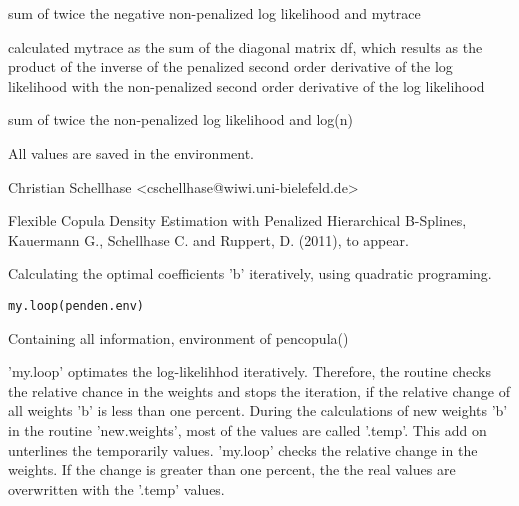 \documentclass[a4paper]{book}
\begin{document}
%
\begin{Value}
\begin{ldescription}
\item[\code{AIC}] sum of twice the negative non-penalized log likelihood and mytrace
\item[\code{trace}] calculated mytrace as the sum of the diagonal matrix
df, which results as the product of the inverse of the penalized
second order derivative of the log likelihood with the non-penalized
second order derivative of the log likelihood
\item[\code{BIC}] sum of twice the non-penalized log likelihood and log(n)
\end{ldescription}
All values are saved in the environment.
\end{Value}
%
\begin{Author}\relax
Christian Schellhase <cschellhase@wiwi.uni-bielefeld.de>
\end{Author}
%
\begin{References}\relax
Flexible Copula Density Estimation with Penalized
Hierarchical B-Splines, Kauermann G., Schellhase C. and Ruppert, D. (2011), to appear.
\end{References}
%
\begin{Description}\relax
Calculating the optimal coefficients 'b' iteratively, using quadratic programing.
\end{Description}
%
\begin{Usage}
\begin{verbatim}
my.loop(penden.env)
\end{verbatim}
\end{Usage}
%
\begin{Arguments}
\begin{ldescription}
\item[\code{penden.env}] Containing all information, environment of pencopula()

\end{ldescription}
\end{Arguments}
%
\begin{Details}\relax
'my.loop' optimates the log-likelihhod iteratively. Therefore, the
routine checks the relative chance in the weights and stops the
iteration, if the relative change of all weights 'b' is less than one
percent. During the calculations of new weights 'b' in the routine
'new.weights', most of the values are called '.temp'. This add on
unterlines the temporarily values. 'my.loop' checks the relative
change in the weights. If the change is greater than one percent, the
the real values are overwritten with the '.temp' values.
\end{Details}
\end{document}
